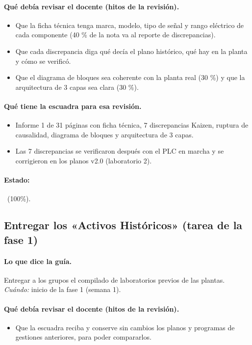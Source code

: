 \documentclass[a4paper,11pt]{article}
\begin{document}
\paragraph{Qué debía revisar el docente (hitos de la revisión).}
\begin{itemize}
\item[$\square$] Que la ficha técnica tenga marca, modelo, tipo de señal y rango eléctrico de cada componente (40 \% de la nota va al reporte de discrepancias).
\item[$\square$] Que cada discrepancia diga qué decía el plano histórico, qué hay en la planta y cómo se verificó.
\item[$\square$] Que el diagrama de bloques sea coherente con la planta real (30 \%) y que la arquitectura de 3 capas sea clara (30 \%).
\end{itemize}
\paragraph{Qué tiene la escuadra para esa revisión.}
\begin{itemize}
\item Informe 1 de 31 páginas con ficha técnica, 7 discrepancias Kaizen, ruptura de causalidad, diagrama de bloques y arquitectura de 3 capas.
\item Las 7 discrepancias se verificaron después con el PLC en marcha y se corrigieron en los planos v2.0 (laboratorio 2).
\end{itemize}
\paragraph{Estado:} \cumple~(100\%).
\subsection{Entregar los «Activos Históricos» (tarea de la fase 1)}
\paragraph{Lo que dice la guía.} Entregar a los grupos el compilado de laboratorios previos de las plantas. \textit{Cuándo:} inicio de la fase 1 (semana 1).
\paragraph{Qué debía revisar el docente (hitos de la revisión).}
\begin{itemize}
\item[$\square$] Que la escuadra reciba y conserve sin cambios los planos y programas de gestiones anteriores, para poder compararlos.
\end{itemize}
\end{document}
